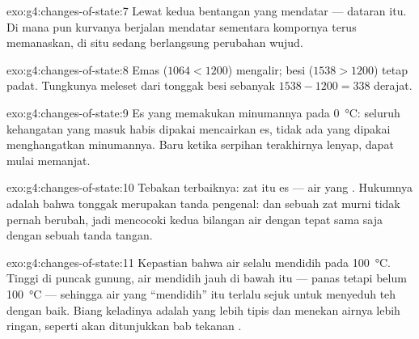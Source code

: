 \begin{solution}{exo:g4:changes-of-state:7}
Lewat kedua bentangan yang mendatar --- dataran itu. Di mana pun
kurvanya berjalan mendatar sementara kompornya terus memanaskan, di
situ sedang berlangsung perubahan wujud.
\end{solution}

\begin{solution}{exo:g4:changes-of-state:8}
Emas ($1064 < 1200$) mengalir; besi ($1538 > 1200$) tetap padat.
Tungkunya meleset dari tonggak besi sebanyak $1538 - 1200 = 338$
derajat.
\end{solution}

\begin{solution}{exo:g4:changes-of-state:9}
Es yang  memakukan minumannya pada \qty{0}{\celsius}: seluruh
kehangatan yang masuk habis dipakai mencairkan es, tidak ada yang
dipakai menghangatkan minumannya. Baru ketika serpihan terakhirnya
lenyap,  dapat mulai memanjat.
\end{solution}

\begin{solution}{exo:g4:changes-of-state:10}
Tebakan terbaiknya: zat itu es --- air yang . Hukumnya adalah
bahwa tonggak merupakan tanda pengenal:  dan 
sebuah zat murni tidak pernah berubah, jadi mencocoki kedua bilangan
air dengan tepat sama saja dengan sebuah tanda tangan.
\end{solution}

\begin{solution}{exo:g4:changes-of-state:11}
Kepastian bahwa air selalu mendidih pada \qty{100}{\celsius}. Tinggi
di puncak gunung, air mendidih jauh di bawah itu --- panas tetapi
belum \qty{100}{\celsius} --- sehingga air yang ``mendidih'' itu
terlalu sejuk untuk menyeduh teh dengan baik. Biang keladinya adalah
 yang lebih tipis dan menekan airnya lebih ringan, seperti akan
ditunjukkan bab tekanan .
\end{solution}
